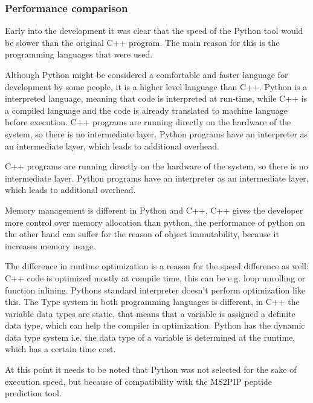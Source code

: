 \documentclass[11pt]{article}
\begin{document}
\subsubsection{Performance comparison}
Early into the development it was clear that the speed of the Python tool would be slower than the original C++ program. The main reason for this is the programming languages that were used. 

Although Python might be considered a comfortable and faster language for development by some people, it is a higher level language than C++. Python is a interpreted language, meaning that code is interpreted at run-time, while C++ is a compiled language and the code is already translated to machine language before execution. C++ programs are running directly on the hardware of the system, so there is no intermediate layer. Python programs have an interpreter as an intermediate layer, which leads to additional overhead.

C++ programs are running directly on the hardware of the system, so there is no intermediate layer. Python programs have an interpreter as an intermediate layer, which leads to additional overhead.

Memory management is different in Python and C++, C++ gives the developer more control over memory allocation than python, the performance of python on the other hand can suffer for the reason of object immutability, because it increases memory usage. 

The difference in runtime optimization is a reason for the speed difference as well: C++ code is optimized mostly at compile time, this can be e.g. loop unrolling or function inlining. Pythons standard interpreter doesn't perform optimization like this. The Type system in both programming languages is different, in C++ the variable data types are static, that means that a variable is assigned a definite data type, which can help the compiler in optimization. Python has the dynamic data type system i.e. the data type of a variable is determined at the runtime, which has a certain time cost.

At this point it needs to be noted that Python was not selected for the sake of execution speed, but because of compatibility with the MS2PIP peptide prediction tool.
\end{document}
